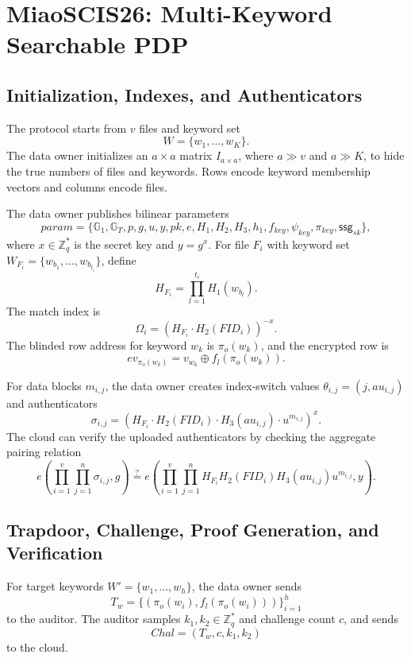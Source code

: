 \documentclass[11pt]{article}
\newcommand{\G}{\mathbb{G}}
\newcommand{\GT}{\mathbb{G}_T}
\newcommand{\Zq}{\mathbb{Z}_q}
\begin{document}
\section{MiaoSCIS26: Multi-Keyword Searchable PDP}

\subsection{Initialization, Indexes, and Authenticators}

The protocol starts from \(v\) files and keyword set
\[
    W=\{w_1,\ldots,w_K\}.
\]
The data owner initializes an \(a\times a\) matrix \(I_{a\times a}\), where
\(a\gg v\) and \(a\gg K\), to hide the true numbers of files and keywords.
Rows encode keyword membership vectors and columns encode files.

The data owner publishes bilinear parameters
\[
    param=\{\G_1,\GT,p,g,u,y,pk,e,H_1,H_2,H_3,h_1,
    f_{key},\psi_{key},\pi_{key},\mathsf{ssg}_{sk}\},
\]
where \(x\in\Zq^\ast\) is the secret key and \(y=g^x\).  For file \(F_i\)
with keyword set \(W_{F_i}=\{w_{b_1},\ldots,w_{b_{t_i}}\}\), define
\[
    H_{F_i}=\prod_{l=1}^{t_i}H_1(w_{b_l}).
\]
The match index is
\[
    \Omega_i=(H_{F_i}\cdot H_2(FID_i))^{-x}.
\]
The blinded row address for keyword \(w_k\) is \(\pi_o(w_k)\), and the
encrypted row is
\[
    ev_{\pi_o(w_k)}=v_{w_k}\oplus f_l(\pi_o(w_k)).
\]

For data blocks \(m_{i,j}\), the data owner creates index-switch values
\(\theta_{i,j}=(j,au_{i,j})\) and authenticators
\[
    \sigma_{i,j}
    =
    \left(
        H_{F_i}\cdot H_2(FID_i)\cdot H_3(au_{i,j})\cdot u^{m_{i,j}}
    \right)^x.
\]
The cloud can verify the uploaded authenticators by checking the aggregate
pairing relation
\[
    e\!\left(\prod_{i=1}^{v}\prod_{j=1}^{n}\sigma_{i,j},g\right)
    \stackrel{?}{=}
    e\!\left(
        \prod_{i=1}^{v}\prod_{j=1}^{n}
        H_{F_i}H_2(FID_i)H_3(au_{i,j})u^{m_{i,j}},
        y
    \right).
\]

\subsection{Trapdoor, Challenge, Proof Generation, and Verification}

For target keywords \(W'=\{w_1,\ldots,w_h\}\), the data owner sends
\[
    T_w=\{(\pi_o(w_i),f_l(\pi_o(w_i)))\}_{i=1}^{h}
\]
to the auditor.  The auditor samples \(k_1,k_2\in\Zq^\ast\) and challenge
count \(c\), and sends
\[
    Chal=(T_w,c,k_1,k_2)
\]
to the cloud.
\end{document}
